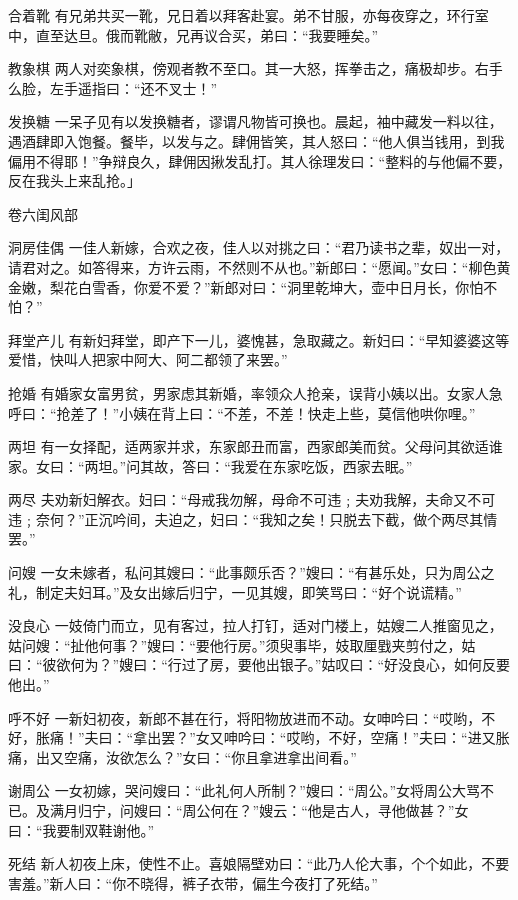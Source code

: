 \documentclass[12pt,UTF8]{ctexbook}
\begin{document}
合着靴
有兄弟共买一靴，兄日着以拜客赴宴。弟不甘服，亦每夜穿之，环行室中，直至达旦。俄而靴敝，兄再议合买，弟曰：“我要睡矣。”

教象棋
两人对奕象棋，傍观者教不至口。其一大怒，挥拳击之，痛极却步。右手么脸，左手遥指曰：“还不叉士！”

发换糖
一呆子见有以发换糖者，谬谓凡物皆可换也。晨起，袖中藏发一料以往，遇酒肆即入饱餐。餐毕，以发与之。肆佣皆笑，其人怒曰：“他人俱当钱用，到我偏用不得耶！”争辩良久，肆佣因揪发乱打。其人徐理发曰：“整料的与他偏不要，反在我头上来乱抢。」

卷六闺风部

洞房佳偶
一佳人新嫁，合欢之夜，佳人以对挑之曰：“君乃读书之辈，奴出一对，请君对之。如答得来，方许云雨，不然则不从也。”新郎曰：“愿闻。”女曰：“柳色黄金嫩，梨花白雪香，你爱不爱？”新郎对曰：“洞里乾坤大，壶中日月长，你怕不怕？”

拜堂产儿
有新妇拜堂，即产下一儿，婆愧甚，急取藏之。新妇曰：“早知婆婆这等爱惜，快叫人把家中阿大、阿二都领了来罢。”

抢婚
有婚家女富男贫，男家虑其新婚，率领众人抢亲，误背小姨以出。女家人急呼曰：“抢差了！”小姨在背上曰：“不差，不差！快走上些，莫信他哄你哩。”

两坦
有一女择配，适两家并求，东家郎丑而富，西家郎美而贫。父母问其欲适谁家。女曰：“两坦。”问其故，答曰：“我爱在东家吃饭，西家去眠。”

两尽
夫劝新妇解衣。妇曰：“母戒我勿解，母命不可违﹔夫劝我解，夫命又不可违﹔奈何？”正沉吟间，夫迫之，妇曰：“我知之矣！只脱去下截，做个两尽其情罢。”

问嫂
一女未嫁者，私问其嫂曰：“此事颇乐否？”嫂曰：“有甚乐处，只为周公之礼，制定夫妇耳。”及女出嫁后归宁，一见其嫂，即笑骂曰：“好个说谎精。”

没良心
一妓倚门而立，见有客过，拉人打钉，适对门楼上，姑嫂二人推窗见之，姑问嫂：“扯他何事？”嫂曰：“要他行房。”须臾事毕，妓取厘戥夹剪付之，姑曰：“彼欲何为？”嫂曰：“行过了房，要他出银子。”姑叹曰：“好没良心，如何反要他出。”

呼不好
一新妇初夜，新郎不甚在行，将阳物放进而不动。女呻吟曰：“哎哟，不好，胀痛！”夫曰：“拿出罢？”女又呻吟曰：“哎哟，不好，空痛！”夫曰：“进又胀痛，出又空痛，汝欲怎么？”女曰：“你且拿进拿出间看。”

谢周公
一女初嫁，哭问嫂曰：“此礼何人所制？”嫂曰：“周公。”女将周公大骂不已。及满月归宁，问嫂曰：“周公何在？”嫂云：“他是古人，寻他做甚？”女曰：“我要制双鞋谢他。”

死结
新人初夜上床，使性不止。喜娘隔壁劝曰：“此乃人伦大事，个个如此，不要害羞。”新人曰：“你不晓得，裤子衣带，偏生今夜打了死结。”
\end{document}
